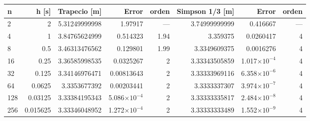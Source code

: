 {\footnotesize
\begin{longtable}{lrrrrrrr}
\toprule
\textbf{n} & \textbf{h [s]} & \textbf{Trapecio [m]} & \textbf{Error} & \textbf{orden} & \textbf{Simpson 1/3 [m]} & \textbf{Error} & \textbf{orden} \\
\midrule
\endhead
2 & 2 & 5.31249999998 & 1.97917 & — & 3.74999999999 & 0.416667 & — \\
4 & 1 & 3.84765624999 & 0.514323 & 1.94 & 3.359375 & 0.0260417 & 4 \\
8 & 0.5 & 3.46313476562 & 0.129801 & 1.99 & 3.3349609375 & 0.0016276 & 4 \\
16 & 0.25 & 3.36585998535 & 0.0325267 & 2 & 3.33343505859 & 1.017$\times10^{-4}$ & 4 \\
32 & 0.125 & 3.34146976471 & 0.00813643 & 2 & 3.33333969116 & 6.358$\times10^{-6}$ & 4 \\
64 & 0.0625 & 3.3353677392 & 0.00203441 & 2 & 3.3333337307 & 3.974$\times10^{-7}$ & 4 \\
128 & 0.03125 & 3.33384195343 & 5.086$\times10^{-4}$ & 2 & 3.33333335817 & 2.484$\times10^{-8}$ & 4 \\
256 & 0.015625 & 3.33346048952 & 1.272$\times10^{-4}$ & 2 & 3.33333333489 & 1.552$\times10^{-9}$ & 4 \\
\bottomrule
\end{longtable}
}
